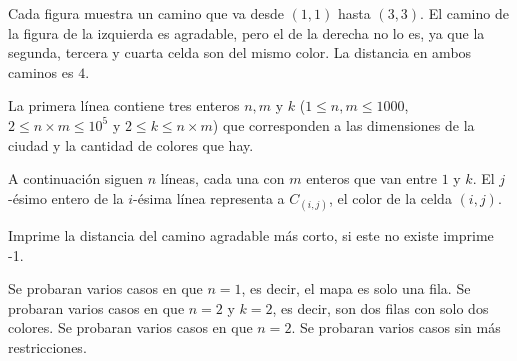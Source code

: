 \documentclass{oci}
\begin{document}
\begin{problemDescription}
Cada figura muestra un camino que va desde $(1,1)$ hasta $(3,3)$.
%
El camino de la figura de la izquierda es agradable, pero el de la derecha
no lo es, ya que la segunda, tercera y cuarta celda son del mismo color.
%
La distancia en ambos caminos es $4$.

\end{problemDescription}


\begin{inputDescription}
La primera línea contiene tres enteros $n, m$ y $k$
($1 \leq n, m \leq 1000$, $2 \leq n\times m \leq 10^5$ y $2 \leq k \leq n \times m$)
que corresponden a las dimensiones de la ciudad y la cantidad de colores que hay.

A continuación siguen $n$ líneas, cada una con $m$ enteros que van entre $1$ y $k$.
%
El $j$-ésimo entero de la $i$-ésima línea representa a $C_{(i,j)}$, el color de la celda $(i,j)$.

\end{inputDescription}

\begin{outputDescription}
Imprime la distancia del camino agradable más corto, si este no existe imprime -1.

\end{outputDescription}

\begin{scoreDescription}
  Se probaran varios casos en que $n = 1$, es decir, el mapa es solo una fila.
  Se probaran varios casos en que $n = 2$ y $k = 2$, es decir, son dos filas con solo dos colores.
  Se probaran varios casos en que $n = 2$.
  Se probaran varios casos sin más restricciones.
\end{scoreDescription}

\begin{sampleDescription}
\end{sampleDescription}
\end{document}
